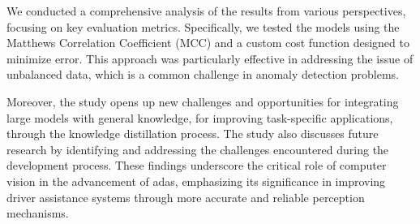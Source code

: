We conducted a comprehensive analysis of the results from various perspectives, 
focusing on key evaluation metrics. Specifically, we tested the models using the 
Matthews Correlation Coefficient (MCC) and a custom cost function designed to 
minimize error. This approach was particularly effective in addressing the issue 
of unbalanced data, which is a common challenge in anomaly detection problems.

Moreover, the study opens up new challenges and opportunities for integrating 
large models with general knowledge, for improving task-specific applications, 
through the knowledge distillation process.
The study also discusses future 
research by identifying and addressing the challenges encountered during the 
development process. These findings underscore the critical role of computer 
vision in the advancement of \acs{adas}, emphasizing its significance in improving 
driver assistance systems through more accurate and reliable perception 
mechanisms.


\afterpage{\blankpage}
